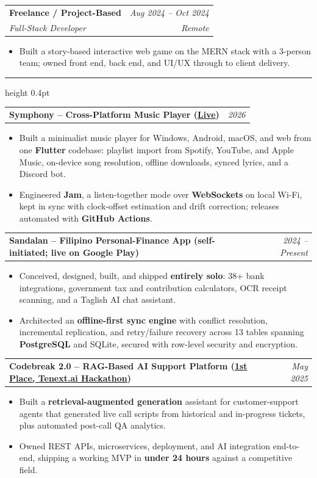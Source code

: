 \documentclass[11pt,a4paper]{article}
\makeatletter
\newcommand{\cvsection}[1]{%
  \par\addvspace{9pt}%
  \noindent{\small\bfseries\color{ink}\MakeUppercase{#1}}%
  \par\nobreak\vspace{2.5pt}%
  {\color{ink}\hrule height 0.4pt}%
  \nobreak\vspace{3pt}%
}
\newcommand{\entry}[4]{%
  \par\smallskip
  \noindent\begin{tabular*}{\linewidth}{@{\extracolsep{\fill}}l r@{}}
    \textbf{#1} & {\small\itshape\color{muted}#3} \\[-2pt]
    {\small\itshape\color{muted}#2} & {\small\itshape\color{muted}#4} \\
  \end{tabular*}\par\vspace{-2pt}
}
\newcommand{\projitem}[2]{%
  \par\smallskip
  \noindent\begin{tabular*}{\linewidth}{@{\extracolsep{\fill}}l r@{}}
    \textbf{#1} & {\small\itshape\color{muted}#2} \\
  \end{tabular*}\par\vspace{-2pt}
}
\makeatother
\begin{document}
\entry{Freelance / Project-Based}{Full-Stack Developer}{Aug 2024 -- Oct 2024}{Remote}
\begin{itemize}
  \item Built a story-based interactive web game on the MERN stack with a 3-person team; owned front end, back end, and UI/UX through to client delivery.
\end{itemize}

\cvsection{Selected Projects}

\projitem{Symphony -- Cross-Platform Music Player \textnormal{(\href{https://symphony.jettimothycerezo.dev}{Live})}}{2026}
\begin{itemize}
  \item Built a minimalist music player for Windows, Android, macOS, and web from one \textbf{Flutter} codebase: playlist import from Spotify, YouTube, and Apple Music, on-device song resolution, offline downloads, synced lyrics, and a Discord bot.
  \item Engineered \textbf{Jam}, a listen-together mode over \textbf{WebSockets} on local Wi-Fi, kept in sync with clock-offset estimation and drift correction; releases automated with \textbf{GitHub Actions}.
\end{itemize}

\projitem{Sandalan -- Filipino Personal-Finance App \textnormal{(self-initiated; live on Google Play)}}{2024 -- Present}
\begin{itemize}
  \item Conceived, designed, built, and shipped \textbf{entirely solo}: 38+ bank integrations, government tax and contribution calculators, OCR receipt scanning, and a Taglish AI chat assistant.
  \item Architected an \textbf{offline-first sync engine} with conflict resolution, incremental replication, and retry/failure recovery across 13 tables spanning \textbf{PostgreSQL} and SQLite, secured with row-level security and encryption.
\end{itemize}

\projitem{Codebreak 2.0 -- RAG-Based AI Support Platform \textnormal{(\href{https://www.facebook.com/photo/?fbid=706685865053901\&set=a.263981095991049}{1st Place, Tenext.ai Hackathon})}}{May 2025}
\begin{itemize}
  \item Built a \textbf{retrieval-augmented generation} assistant for customer-support agents that generated live call scripts from historical and in-progress tickets, plus automated post-call QA analytics.
  \item Owned REST APIs, microservices, deployment, and AI integration end-to-end, shipping a working MVP in \textbf{under 24 hours} against a competitive field.
\end{itemize}
\end{document}
